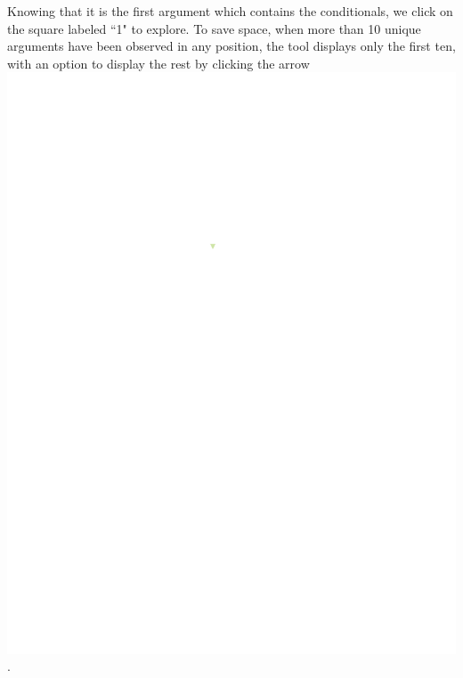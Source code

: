 \documentclass[conference]{IEEEtran}
\begin{document}
	Knowing that it is the first argument which contains the conditionals, we click
	on the square labeled ``1" to explore. To save space, when more than 10 unique
	arguments have been observed in any position, the tool displays only the first
	ten, with an option to display the rest by clicking the arrow
	\includegraphics{glossary-arrow}.
	
\end{document}
